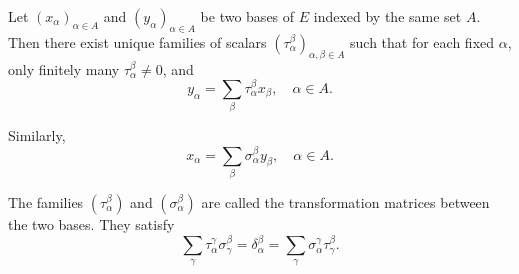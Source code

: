 Let $(x_\alpha)_{\alpha \in A}$ and $(y_\alpha)_{\alpha \in A}$ be two bases of $E$ indexed by the same set $A$. Then there exist unique families of scalars $(\tau_\alpha^\beta)_{\alpha,\beta \in A}$ such that for each fixed $\alpha$, only finitely many $\tau_\alpha^\beta \neq 0$, and
$$y_\alpha = \sum_\beta \tau_\alpha^\beta x_\beta, \quad \alpha \in A.$$

Similarly,
$$x_\alpha = \sum_\beta \sigma_\alpha^\beta y_\beta, \quad \alpha \in A.$$

The families $(\tau_\alpha^\beta)$ and $(\sigma_\alpha^\beta)$ are called the transformation matrices between the two bases. They satisfy
$$\sum_\gamma \tau_\alpha^\gamma \sigma_\gamma^\beta = \delta_\alpha^\beta = \sum_\gamma \sigma_\alpha^\gamma \tau_\gamma^\beta.$$
